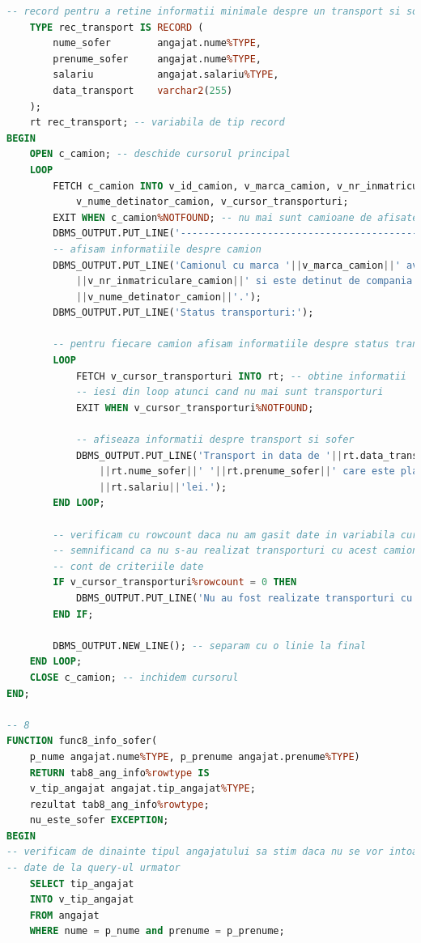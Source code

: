 \documentclass[12pt, a4paper]{article}
\begin{document}
\begin{lstlisting}[language=SQL]
    -- record pentru a retine informatii minimale despre un transport si sofer
    TYPE rec_transport IS RECORD (
        nume_sofer        angajat.nume%TYPE,
        prenume_sofer     angajat.nume%TYPE,
        salariu           angajat.salariu%TYPE,
        data_transport    varchar2(255)
    );
    rt rec_transport; -- variabila de tip record 
BEGIN
    OPEN c_camion; -- deschide cursorul principal
    LOOP
        FETCH c_camion INTO v_id_camion, v_marca_camion, v_nr_inmatriculare_camion,
            v_nume_detinator_camion, v_cursor_transporturi;
        EXIT WHEN c_camion%NOTFOUND; -- nu mai sunt camioane de afisate
        DBMS_OUTPUT.PUT_LINE('-----------------------------------------------'); -- separator
        -- afisam informatiile despre camion
        DBMS_OUTPUT.PUT_LINE('Camionul cu marca '||v_marca_camion||' avand nr. de inmatriculare '
            ||v_nr_inmatriculare_camion||' si este detinut de compania '
            ||v_nume_detinator_camion||'.');
        DBMS_OUTPUT.PUT_LINE('Status transporturi:');
        
        -- pentru fiecare camion afisam informatiile despre status transporturi
        LOOP
            FETCH v_cursor_transporturi INTO rt; -- obtine informatii 
            -- iesi din loop atunci cand nu mai sunt transporturi
            EXIT WHEN v_cursor_transporturi%NOTFOUND;
            
            -- afiseaza informatii despre transport si sofer
            DBMS_OUTPUT.PUT_LINE('Transport in data de '||rt.data_transport||' realizat de '
                ||rt.nume_sofer||' '||rt.prenume_sofer||' care este platit lunar cu '
                ||rt.salariu||'lei.');
        END LOOP;
        
        -- verificam cu rowcount daca nu am gasit date in variabila cursor
        -- semnificand ca nu s-au realizat transporturi cu acest camion inand 
        -- cont de criteriile date
        IF v_cursor_transporturi%rowcount = 0 THEN
            DBMS_OUTPUT.PUT_LINE('Nu au fost realizate transporturi cu acest camion.');
        END IF;
        
        DBMS_OUTPUT.NEW_LINE(); -- separam cu o linie la final
    END LOOP;
    CLOSE c_camion; -- inchidem cursorul
END;

-- 8
FUNCTION func8_info_sofer(
    p_nume angajat.nume%TYPE, p_prenume angajat.prenume%TYPE)
    RETURN tab8_ang_info%rowtype IS
    v_tip_angajat angajat.tip_angajat%TYPE;
    rezultat tab8_ang_info%rowtype;
    nu_este_sofer EXCEPTION;
BEGIN
-- verificam de dinainte tipul angajatului sa stim daca nu se vor intoarce
-- date de la query-ul urmator
    SELECT tip_angajat
    INTO v_tip_angajat
    FROM angajat
    WHERE nume = p_nume and prenume = p_prenume;    


\end{lstlisting}
\end{document}

